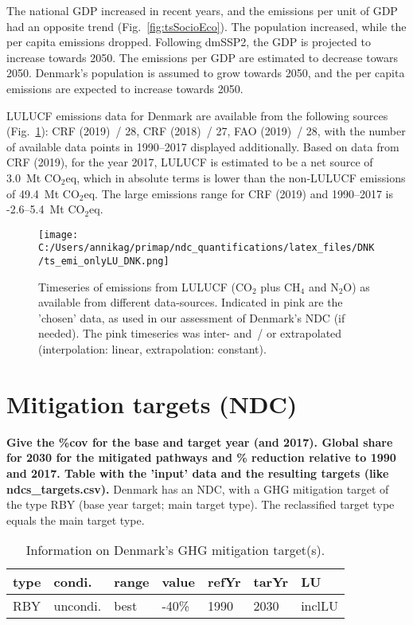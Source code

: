 \documentclass[12pt]{article}
\begin{document}
 The national GDP increased in recent years, and the emissions per unit of GDP had an opposite trend (Fig.~\ref{fig:tsSocioEco}).
 The population increased, while the per capita emissions dropped. 
 Following dmSSP2, the GDP is projected to increase towards 2050. 
 The emissions per GDP are estimated to decrease towars 2050. 
 Denmark's population is assumed to grow towards 2050, and the per capita emissions are expected to increase towards 2050. 

 LULUCF emissions data for Denmark are available from the following sources (Fig.~\ref{fig:tsLULUCF}): CRF (2019)~/ 28, CRF (2018)~/ 27, FAO (2019)~/ 28, with the number of available data points in 1990--2017 displayed additionally.
 Based on data from CRF (2019), for the year 2017, LULUCF is estimated to be a net source of 3.0~Mt CO$_2$eq, which in absolute terms is lower than the non-LULUCF emissions of 49.4~Mt CO$_2$eq.
 The large emissions range for CRF (2019) and 1990--2017 is -2.6--5.4~Mt CO$_2$eq.

 \begin{figure}[H]
 \centering
 \texttt{[image: C:/Users/annikag/primap/ndc\_quantifications/latex\_files/DNK/ts\_emi\_onlyLU\_DNK.png]}
 \caption{Timeseries of emissions from LULUCF (CO$_2$ plus CH$_4$ and N$_2$O) as available from different data-sources. 
 Indicated in pink are the 'chosen' data, as used in our assessment of Denmark's NDC (if needed). 
 The pink timeseries was inter- and~/ or extrapolated (interpolation: linear, extrapolation: constant).}
 \label{fig:tsLULUCF}
 \end{figure}

 \newpage %
 \section{Mitigation targets (NDC)}
 \label{sec:mitiTars}

 \textbf{ 
 Give the \%cov for the base and target year (and 2017). \newline
 Global share for 2030 for the mitigated pathways and \% reduction relative to 1990 and 2017. \newline
 Table with the 'input' data and the resulting targets (like ndcs\_targets.csv). \newline}
 Denmark has an NDC, with a GHG mitigation target of the type RBY (base year target; main target type).
 The reclassified target type equals the main target type.

 \begin{table}[H]
 \centering
 \caption{Information on Denmark's GHG mitigation target(s).}
 \label{tab:mitiTars}
 \begin{tabular}{l l l l l l l }
 \bfseries type & \bfseries condi. & \bfseries range & \bfseries value & \bfseries refYr & \bfseries tarYr & \bfseries LU \tabularnewline \hline \hline
 RBY & uncondi. & best & -40\% & 1990 & 2030 & inclLU \tabularnewline 
 \end{tabular}
 \end{table}
\end{document}
